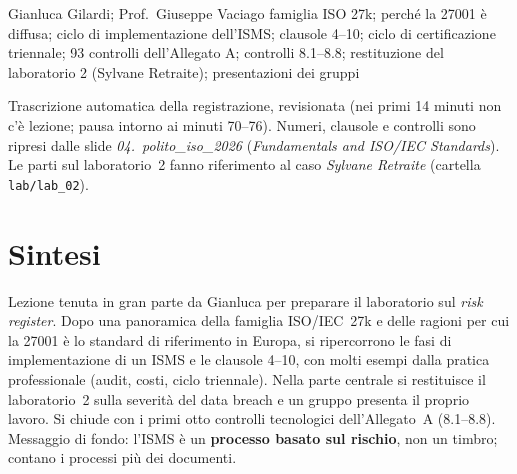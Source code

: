  {Gianluca Gilardi; Prof.~Giuseppe Vaciago}
  {famiglia ISO 27k; perché la 27001 è diffusa; ciclo di implementazione dell'ISMS; clausole 4--10;
   ciclo di certificazione triennale; 93 controlli dell'Allegato A; controlli 8.1--8.8;
   restituzione del laboratorio 2 (Sylvane Retraite); presentazioni dei gruppi}
\label{lez:2026-10-19}

\begin{nota}[Fonte]
Trascrizione automatica della registrazione, revisionata (nei primi 14 minuti non c'è lezione; pausa
intorno ai minuti 70--76). Numeri, clausole e controlli sono ripresi dalle slide
\emph{04.~polito\_iso\_2026} (\emph{Fundamentals and ISO/IEC Standards}). Le parti sul laboratorio~2
fanno riferimento al caso \emph{Sylvane Retraite} (cartella \texttt{lab/lab\_02}).
\end{nota}

\section{Sintesi}
Lezione tenuta in gran parte da Gianluca per preparare il laboratorio sul \emph{risk register}. Dopo una
panoramica della famiglia ISO/IEC~27k e delle ragioni per cui la 27001 è lo standard di riferimento in
Europa, si ripercorrono le fasi di implementazione di un ISMS e le clausole 4--10, con molti esempi
dalla pratica professionale (audit, costi, ciclo triennale). Nella parte centrale si restituisce il
laboratorio~2 sulla severità del data breach e un gruppo presenta il proprio lavoro. Si chiude con i
primi otto controlli tecnologici dell'Allegato~A (8.1--8.8). Messaggio di fondo: l'ISMS è un
\textbf{processo basato sul rischio}, non un timbro; contano i processi più dei documenti.

